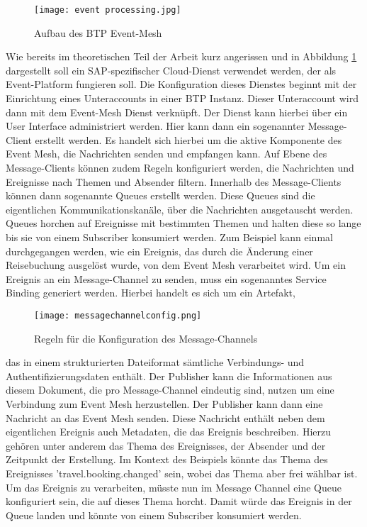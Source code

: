   \begin{figure}[H]
    \centering
    \texttt{[image: event processing.jpg]}
    \caption[BTP Event-Mesh]{Aufbau des BTP Event-Mesh \footnotemark}
    \label{EMprocessing}
  \end{figure}
  Wie bereits im theoretischen Teil der Arbeit kurz angerissen und in Abbildung \ref{EMprocessing} dargestellt soll ein SAP-spezifischer Cloud-Dienst verwendet werden, der als Event-Platform fungieren soll. Die Konfiguration dieses Dienstes beginnt mit der Einrichtung eines Unteraccounts in einer \ac{BTP} Instanz. Dieser Unteraccount wird dann mit dem Event-Mesh Dienst verknüpft. Der Dienst kann hierbei über ein User Interface administriert werden. Hier kann dann ein sogenannter Message-Client erstellt werden. Es handelt sich hierbei um die aktive Komponente des Event Mesh, die Nachrichten senden und empfangen kann. Auf Ebene des Message-Clients können zudem Regeln konfiguriert werden, die Nachrichten und Ereignisse nach Themen und Absender filtern. Innerhalb des Message-Clients können dann sogenannte Queues erstellt werden. Diese Queues sind die eigentlichen Kommunikationskanäle, über die Nachrichten ausgetauscht werden. Queues horchen auf Ereignisse mit bestimmten Themen und halten diese so lange bis sie von einem Subscriber konsumiert werden. Zum Beispiel kann einmal durchgegangen werden, wie ein Ereignis, das durch die Änderung einer Reisebuchung ausgelöst wurde, von dem Event Mesh verarbeitet wird. Um ein Ereignis an ein Message-Channel zu senden, muss ein sogenanntes Service Binding generiert werden. Hierbei handelt es sich um ein Artefakt, 
   \begin{wrapfigure}{l}{7cm}
   \centering
   \texttt{[image: messagechannelconfig.png]}
   \caption[Message-Channel Konfiguration]{Regeln für die Konfiguration des Message-Channels \footnotemark}
   \label{MesChannelConfig}
 \end{wrapfigure}
  das in einem strukturierten Dateiformat sämtliche Verbindungs- und Authentifizierungsdaten enthält.  Der Publisher kann die Informationen aus diesem Dokument, die pro Message-Channel eindeutig sind, nutzen um eine Verbindung zum Event Mesh herzustellen. Der Publisher kann dann eine Nachricht an das Event Mesh senden. Diese Nachricht enthält neben dem eigentlichen Ereignis auch Metadaten, die das Ereignis beschreiben.  
  Hierzu gehören unter anderem das Thema des Ereignisses, der Absender und der Zeitpunkt der Erstellung. Im Kontext des Beispiels könnte das Thema des Ereignisses 'travel.booking.changed' sein, wobei das Thema aber frei wählbar ist. Um das Ereignis zu verarbeiten, müsste nun im Message Channel eine Queue konfiguriert sein, die auf dieses Thema horcht. Damit würde das Ereignis in der Queue landen und könnte von einem Subscriber konsumiert werden. 
